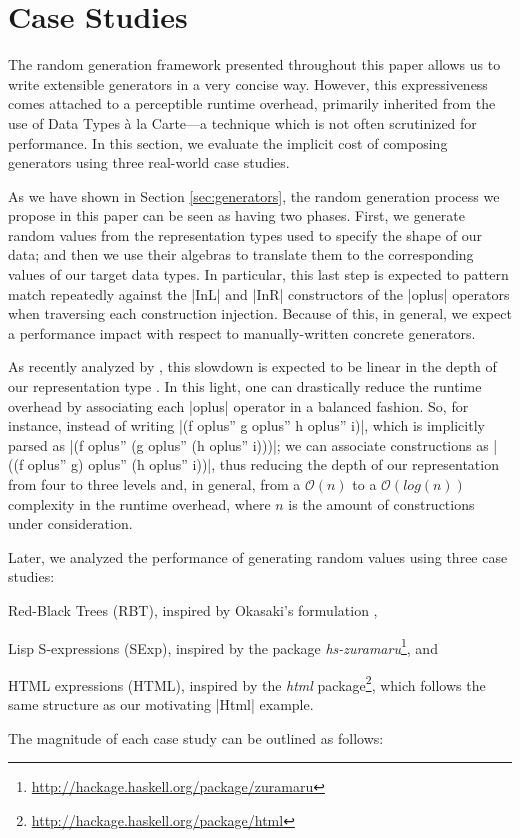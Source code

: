 \section{Case Studies}
\label{sec:casestudies}

The random generation framework presented throughout this paper allows us to
write extensible generators in a very concise way.
%
However, this expressiveness comes attached to a perceptible runtime overhead,
primarily inherited from the use of Data Types \`a la Carte---a technique which
is not often scrutinized for performance.
%
In this section, we evaluate the implicit cost of composing generators using
three real-world case studies.


As we have shown in Section \ref{sec:generators}, the random generation
process we propose in this paper can be seen as having two phases.
%
First, we generate random values from the representation types used to specify
the shape of our data; and then we use their algebras to translate them to the
corresponding values of our target data types.
%
In particular, this last step is expected to pattern match repeatedly against
the |InL| and |InR| constructors of the |oplus| operators when traversing each
construction injection.
%
Because of this, in general, we expect a performance impact with respect to
manually-written concrete generators.


As recently analyzed by \citeauthor{KiriyamaOptimizingDTC}, this slowdown is
expected to be linear in the depth of our representation type
\cite{KiriyamaOptimizingDTC}.
%
In this light, one can drastically reduce the runtime overhead by associating
each |oplus| operator in a balanced fashion.
%
So, for instance, instead of writing |(f oplus'' g oplus'' h oplus'' i)|, which
is implicitly parsed as |(f oplus'' (g oplus'' (h oplus'' i)))|; we can
associate constructions as |((f oplus'' g) oplus'' (h oplus'' i))|, thus
reducing the depth of our representation from four to three levels and, in
general, from a $\mathcal{O}(n)$ to a $\mathcal{O}(log(n))$ complexity in the
runtime overhead, where $n$ is the amount of constructions under consideration.


Later, we analyzed the performance of generating random values using three case
studies:
%
\begin{inparaenum}[(i)]
\item Red-Black Trees (RBT), inspired by Okasaki's formulation
  \cite{okasaki1999red},
\item Lisp S-expressions (SExp), inspired by the package
  \emph{hs-zuramaru}\footnote{\url{http://hackage.haskell.org/package/zuramaru}},
  and
\item HTML expressions (HTML), inspired by the \emph{html}
  package\footnote{\url{http://hackage.haskell.org/package/html}}, which follows
  the same structure as our motivating |Html| example.
\end{inparaenum}
%
The magnitude of each case study can be outlined as follows:

